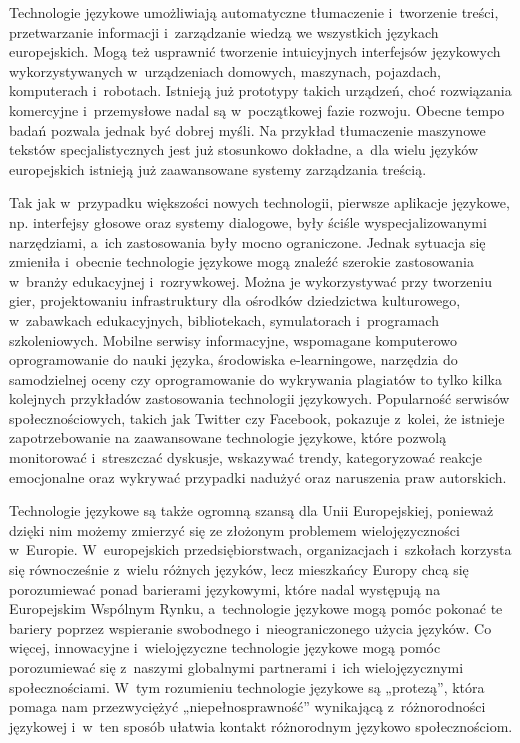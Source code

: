 \begin{multicols}{2}
Technologie językowe umożliwiają automatyczne tłumaczenie
i~tworzenie treści, przetwarzanie informacji i~zarządzanie wiedzą
we wszystkich językach europejskich. Mogą też usprawnić tworzenie
intuicyjnych interfejsów językowych wykorzystywanych w~urządzeniach
domowych, maszynach, pojazdach, komputerach i~robotach. Istnieją już
prototypy takich urządzeń, choć rozwiązania komercyjne
i~przemysłowe nadal są w~początkowej fazie rozwoju. Obecne tempo
badań pozwala jednak być dobrej myśli. Na przykład tłumaczenie
maszynowe tekstów specjalistycznych jest już stosunkowo dokładne,
a~dla wielu języków europejskich istnieją już zaawansowane systemy
zarządzania treścią. 

Tak jak w~przypadku większości nowych technologii, pierwsze
aplikacje językowe, np. interfejsy głosowe oraz systemy dialogowe,
były ściśle wyspecjalizowanymi narzędziami, a~ich zastosowania
były mocno ograniczone. Jednak sytuacja się zmieniła i~obecnie
technologie językowe mogą znaleźć szerokie zastosowania w~branży
edukacyjnej i~rozrywkowej. Można je wykorzystywać przy tworzeniu
gier, projektowaniu infrastruktury dla ośrodków dziedzictwa
kulturowego, w~zabawkach edukacyjnych, bibliotekach, symulatorach
i~programach szkoleniowych. Mobilne serwisy informacyjne, wspomagane
komputerowo oprogramowanie do nauki języka, środowiska
e-learningowe, narzędzia do samodzielnej oceny czy oprogramowanie do
wykrywania plagiatów to tylko kilka kolejnych przykładów
zastosowania technologii językowych. Popularność serwisów
społecznościowych, takich jak Twitter czy Facebook, pokazuje
z~kolei, że istnieje zapotrzebowanie na zaawansowane technologie
językowe, które pozwolą monitorować i~streszczać dyskusje,
wskazywać trendy, kategoryzować reakcje emocjonalne oraz wykrywać
przypadki nadużyć oraz naruszenia praw autorskich. 

Technologie językowe są także ogromną szansą dla Unii
Europejskiej, ponieważ dzięki nim możemy zmierzyć się ze
złożonym problemem wielojęzyczności w~Europie. W~europejskich
przedsiębiorstwach, organizacjach i~szkołach korzysta się
równocześnie z~wielu różnych języków, lecz mieszkańcy Europy
chcą się porozumiewać ponad barierami językowymi, które nadal
występują na Europejskim Wspólnym Rynku, a~technologie językowe
mogą pomóc pokonać te bariery poprzez wspieranie swobodnego
i~nieograniczonego użycia języków. Co więcej, innowacyjne
i~wielojęzyczne technologie językowe mogą pomóc porozumiewać się
z~naszymi globalnymi partnerami i~ich wielojęzycznymi
społecznościami. W~tym rozumieniu technologie językowe są
„protezą”, która pomaga nam przezwyciężyć
„niepełnosprawność” wynikającą z~różnorodności językowej
i~w~ten sposób ułatwia kontakt różnorodnym językowo
społecznościom. 


\end{multicols}
